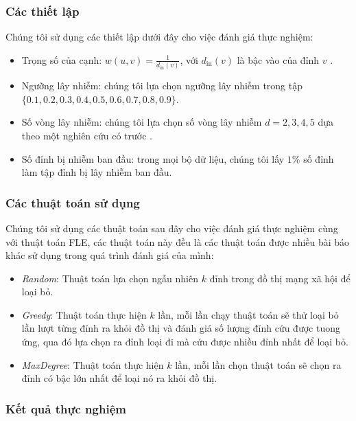 \subsubsection{Các thiết lập}
Chúng tôi sử dụng các thiết lập dưới đây cho việc đánh giá thực nghiệm:

\begin{itemize}
	\item Trọng số của cạnh: $w(u,v)=\frac{1}{d_{\text{in}}(v)}$, với $d_{\text{in}}(v)$ là bậc vào của đỉnh $v$ \cite{kemple1} \cite{chen10LT} \cite{khali} \cite{amit21}.
	\item Ngưỡng lây nhiễm: chúng tôi lựa chọn ngưỡng lây nhiễm trong tập \\ $\{0.1, 0.2, 0.3, 0.4, 0.5, 0.6, 0.7, 0.8, 0.9\}$.
	\item Số vòng lây nhiễm: chúng tôi lựa chọn số vòng lây nhiễm $d = 2, 3, 4, 5$ dựa theo một nghiên cứu có trước \cite{cha23}.
	\item Số đỉnh bị nhiễm ban đầu: trong mọi bộ dữ liệu, chúng tôi lấy $1\%$ số đỉnh làm tập đỉnh bị lây nhiễm ban đầu. 
\end{itemize}

\subsubsection{Các thuật toán sử dụng}
Chúng tôi sử dụng các thuật toán sau đây cho việc đánh giá thực nghiệm cùng với thuật toán FLE, các thuật toán này đều là các thuật toán được nhiều bài báo khác sử dụng trong quá trình đánh giá của mình:

\begin{itemize}
	\item {\itshape Random}: Thuật toán lựa chọn ngẫu nhiên $k$ đỉnh trong đồ thị mạng xã hội để loại bỏ.
	\item {\itshape Greedy}: Thuật toán thực hiện $k$ lần, mỗi lần chạy thuật toán sẽ thử loại bỏ lần lượt từng đỉnh ra khỏi đồ thị và đánh giá số lượng đỉnh cứu được tuong ứng, qua đó lựa chọn ra đỉnh loại đi mà cứu được nhiều đỉnh nhất để loại bỏ.
	\item {\itshape MaxDegree}: Thuật toán thực hiện $k$ lần, mỗi lần chọn thuật toán sẽ chọn ra đỉnh có bậc lớn nhất để loại nó ra khỏi đồ thị. 
\end{itemize} 

\subsubsection{Kết quả thực nghiệm}

